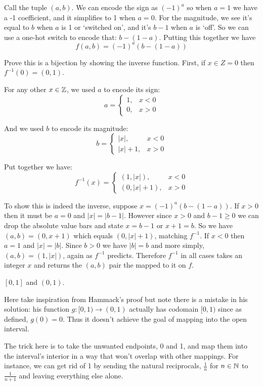 \documentclass{article}
\begin{document}
Call the tuple $(a, b)$. We can encode the sign as $(-1)^a$ so when $a = 1$ we have a -1 coefficient, and it simplifies to 1 when $a = 0$. For the magnitude, we see it's equal to $b$ when $a$ is 1 or `switched on', and it's $b - 1$ when $a$ is `off'. So we can use a one-hot switch to encode that: $b - (1 - a)$. Putting this together we have
$$f(a, b) = (-1)^a(b - (1 - a))$$

Prove this is a bijection by showing the inverse function. First, if $x \in Z = 0$ then $f^{-1}(0) = (0, 1)$.

For any other $x \in \mathbb{Z}$, we used $a$ to encode its sign:
$$a = \begin{cases}
    1, & x < 0 \\
    0, & x > 0
  \end{cases}
$$

And we used $b$ to encode its magnitude:
$$
  b = \begin{cases}
    |x|,     & x < 0 \\
    |x| + 1, & x > 0
  \end{cases}
$$

Put together we have:
$$f^{-1}(x) = \begin{cases}
    (1, |x|),     & x < 0 \\
    (0, |x| + 1), & x > 0
  \end{cases}$$

To show this is indeed the inverse, suppose $x = (-1)^a (b - (1 - a))$. If $x > 0$ then it must be $a = 0$ and $|x| = |b - 1|$. However since $x > 0$ and $b - 1 \geq 0$ we can drop the absolute value bars and state $x = b - 1$ or $x + 1 = b$. So we have $(a, b) = (0, x + 1)$ which equals $(0, |x| + 1)$, matching $f^{-1}$. If $x < 0$ then $a = 1$ and $|x| = |b|$. Since $b > 0$ we have $|b| = b$ and more simply, $(a, b) = (1, |x|)$, again as $f^{-1}$ predicts. Therefore $f^{-1}$ in all cases takes an integer $x$ and returns the $(a, b)$ pair the mapped to it on $f$.

\begin{problem}
$[0, 1]$ and $(0, 1)$.
\end{problem}

Here take inspiration from Hammack's proof but note there is a mistake in his solution: his function $g: [0, 1) \to (0, 1)$ actually has codomain $[0, 1)$ since as defined, $g(0) = 0$. Thus it doesn't achieve the goal of mapping into the open interval.

The trick here is to take the unwanted endpoints, 0 and 1, and map them into the interval's interior in a way that won't overlap with other mappings. For instance, we can get rid of 1 by sending the natural reciprocals, $\frac{1}{n}$ for $n \in \mathbb{N}$ to $\frac{1}{n+1}$ and leaving everything else alone.
\end{document}
